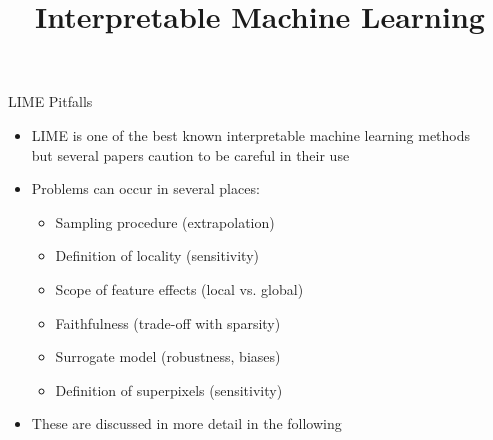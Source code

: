 \documentclass[11pt,compress,t,notes=noshow, aspectratio=169, xcolor=table]{beamer}
\title{Interpretable Machine Learning}
\date{}
\begin{document}
	
	
	
	
	
	\newcommand{\titlefigure}{figure/lime5}
    \newcommand{\learninggoals}{
    	\item Learn why LIME should be used with caution
    	\item Possible pitfalls of LIME}
	
	
	


\begin{vbframe}[c]{LIME Pitfalls}
  \begin{itemize}
  	\item LIME is one of the best known interpretable machine learning methods\\ but several papers caution to be careful in their use 
  	\item Problems can occur in several places: 
  	\begin{itemize}
  	    \item Sampling procedure (extrapolation)
  	    \item Definition of locality (sensitivity)
  	    \item Scope of feature effects (local vs. global)
  	    \item Faithfulness (trade-off with sparsity)
  	    \item Surrogate model (robustness, biases)
  	    \item Definition of superpixels (sensitivity)
  	\end{itemize}
  	\item These are discussed in more detail in the following 
  \end{itemize}
  
\end{vbframe}
  
\end{document}
